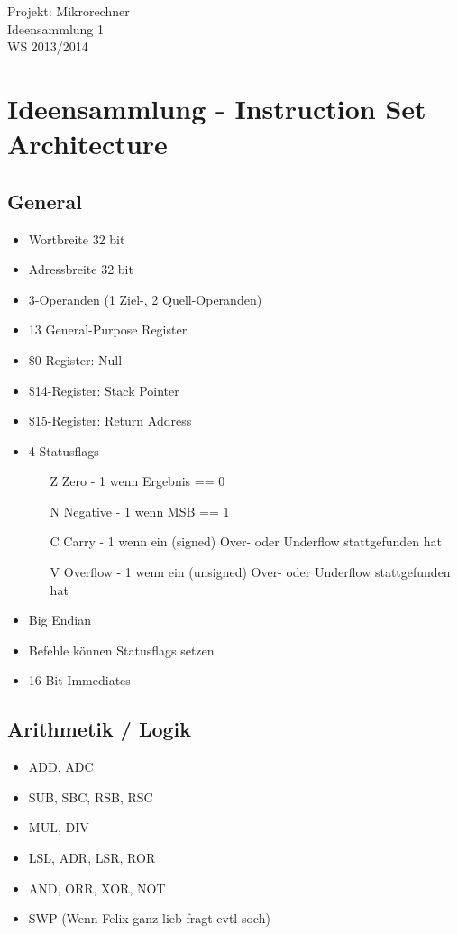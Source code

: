 \documentclass[a4paper]{article}
\newcommand{\titelblock}{
\sloppy
\begin{center}
\sffamily
{\Large{\veranstaltung \\}}
{\Huge{\doctitle  \nummer}\\}
\vspace{0.5cm}
\tutorium \\
\hrulefill
\end{center}
}
\newcommand{\doctitle}{Ideensammlung}
\newcommand{\nummer}{ 1} %
\newcommand{\tutorium}{WS 2013/2014}
\newcommand{\veranstaltung}{Projekt: Mikrorechner}
\begin{document}
\titelblock

\section{Ideensammlung - Instruction Set Architecture}

\subsection{General}

\begin{multicols}{2}
\begin{itemize}
  \item Wortbreite 32 bit
  \item Adressbreite 32 bit
  \item 3-Operanden (1 Ziel-, 2 Quell-Operanden)
  \item 13 General-Purpose Register
  \item \$0-Register: Null
  \item \$14-Register: Stack Pointer
  \item \$15-Register: Return Address
  \item 4 Statusflags
  \begin{itemize}
    \item[Z] Zero - 1 wenn Ergebnis == 0
    \item[N] Negative - 1 wenn MSB == 1
    \item[C] Carry - 1 wenn ein (signed) Over- oder Underflow stattgefunden hat
    \item[V] Overflow - 1 wenn ein (unsigned) Over- oder Underflow stattgefunden hat
  \end{itemize}
  \item Big Endian
  \item Befehle können Statusflags setzen
  \item 16-Bit Immediates
\end{itemize}

\subsection{Arithmetik / Logik}

\begin{itemize}
\item ADD, ADC
\item SUB, SBC, RSB, RSC
\item MUL, DIV
\item LSL, ADR, LSR, ROR 
\item AND, ORR, XOR, NOT
\item SWP (Wenn Felix ganz lieb fragt evtl soch)
\end{itemize}


\end{multicols}
\end{document}
